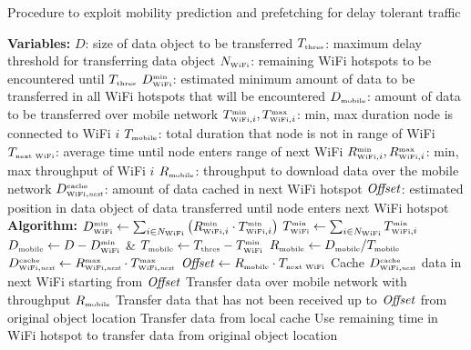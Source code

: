 \documentclass{sig-alternate}
\begin{document}
\newcommand{\tnext}{\mbox{\emph {\tiny next}}}
\newcommand{\Offset}{\mbox{\emph {Offset}}}

\renewcommand{\algorithmiccomment}[1]{/* #1 */}




\begin{algorithm}
\caption{Procedure to exploit mobility prediction and prefetching for delay tolerant traffic}
\begin{algorithmic}[1]
\label{alg:delaytolerant}
{\scriptsize
\STATE \textbf{Variables:}
\STATE $D$: size of data object to be transferred
\STATE $T_{\mbox{{\tiny thres}}}$: maximum delay threshold for transferring data object
\STATE $N_{\mbox{{\tiny WiFi}}}$: remaining  WiFi hotspots to be encountered until $T_{\mbox{{\tiny thres}}}$
\STATE $D^{\mbox{{\tiny min}}}_{\mbox{{\tiny WiFi}}}$: estimated minimum amount of data to be transferred in all WiFi hotspots that will be encountered
\STATE $D_{\mbox{{\tiny mobile}}}$: amount of data  to be transferred over mobile network
\STATE $T^{\mbox{{\tiny min}}}_{\mbox{{\tiny WiFi}}, i}, T^{\mbox{{\tiny max}}}_{\mbox{{\tiny WiFi}}, i}$: min, max duration node is connected  to WiFi  $i$
\STATE $T_{\mbox{{\tiny mobile}}}$: total duration that node is not in range of WiFi
\STATE $T_{{\mbox{\tiny next WiFi}}}$: average time until node enters range of next WiFi
\STATE $R^{\mbox{{\tiny min}}}_{\mbox{{\tiny WiFi}}, i}, R^{\mbox{{\tiny max}}}_{\mbox{{\tiny WiFi}}, i}$: min, max throughput of WiFi  $i$
\STATE $R_{\mbox{{\tiny mobile}}}$: throughput to download data over the mobile network
\STATE $D^{\tcache}_{\twifi, \tnext}$: amount of data cached  in next WiFi hotspot
\STATE $\Offset$: estimated position in data object of data transferred until node enters next WiFi hotspot
\STATE \textbf{Algorithm:}
 \label{line:mobile}
\STATE  $D^{\mbox{{\tiny min}}}_{\mbox{{\tiny WiFi}}}  \leftarrow \sum_{i \in N_{\mbox{{\tiny WiFi}}}} \left ( R^{\mbox{{\tiny min}}}_{\mbox{{\tiny WiFi}}, i} \cdot T^{\mbox{{\tiny min}}}_{\mbox{{\tiny WiFi}}, i} \right )$ \label{line:datawifi}
\STATE $T^{\mbox{{\tiny min}}}_{\mbox{{\tiny WiFi}}}  \leftarrow \sum_{i \in N_{\mbox{{\tiny WiFi}}}} T^{\mbox{{\tiny min}}}_{\mbox{{\tiny WiFi}}, i}$ \label{line:timewifi}
\STATE  $D_{\mbox{{\tiny mobile}}} \leftarrow D-D^{\mbox{{\tiny min}}}_{\mbox{{\tiny WiFi}}}$ \& $T_{\mbox{{\tiny mobile}}} \leftarrow T_{\mbox{{\tiny thres}}}-T^{\mbox{{\tiny min}}}_{\mbox{{\tiny WiFi}}}$ \label{line:datatimemobile}
\STATE $R_{\mbox{{\tiny mobile}}} \leftarrow  D_{\mbox{{\tiny mobile}}}/T_{\mbox{{\tiny mobile}}}$ \label{line:thrmobile}
\STATE $D^{\tcache}_{\twifi, \tnext} \leftarrow  R^{\tmax}_{\twifi, \tnext} \cdot T^{\tmax}_{\twifi, \tnext}$ \label{line:cache}
\STATE $\Offset \leftarrow  R_{\tmobile} \cdot T_{ {\mbox{\tiny  next WiFi}}}$ \label{line:offset}
\STATE Cache $D^{\tcache}_{\twifi, \tnext}$ data in next WiFi starting from $\Offset$
\STATE Transfer data over mobile network with throughput $R_{\mbox{{\tiny mobile}}}$
 \label{line:wifi}
\STATE Transfer data that has not been received up to $\Offset$ from original object location \label{line:adsl_before}
\STATE Transfer data from  local cache
\STATE Use remaining time in WiFi hotspot to transfer data from original object location \label{line:adsl_after}
\ENDIF
\label{line:1end}
\\ }
\end{algorithmic}
\end{algorithm}
\end{document}
